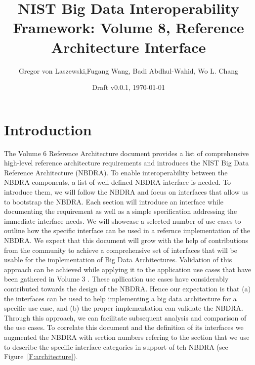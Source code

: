\documentclass[10pt]{article}
\title{NIST Big Data Interoperability Framework: Volume 8, Reference Architecture Interface}
\author{Gregor von Laszewski,Fugang Wang, Badi Abdhul-Wahid, Wo L. Chang}
\date{Draft v0.0.1, \today}
\begin{document}



\flushbottom %




%


\newpage

\linenumbers
\section{Introduction}

The Volume 6 Reference Architecture document provides a list of comprehensive high-level reference architecture requirements and introduces the NIST Big Data Reference Architecture (NBDRA).  To enable interoperability between the NBDRA components, a list of well-defined NBDRA interface is needed. To introduce them, we will follow the NBDRA and focus on interfaces that allow us to bootstrap the NBDRA. Each section will introduce an interface while documenting the requirement as well as a simple specification addressing the immediate interface needs. We will showcase a selected number of use cases to outline how the specific interface can be used in a refernce implementation of the NBDRA. We expect that this document will grow with the help of contributions from the community to achieve a comprehensive set of interfaces that will be usable for the implementation of Big Data Architectures. Validation of this approach can be achieved while applying it to the application use cases that have been gathered in Volume 3 \cite{}. These apllication use cases have considerably contributed towards the design of the NBDRA. Hence our expectation is that (a) the interfaces can be used to help implementing a big data architecture for a specific use case, and (b) the proper implementation can validate the NBDRA. Through this approach, we can facilitate subsequent analysis and comparison of the use cases. To correlate this document and the definition of its interfaces we augmented the NBDRA with section numbers refering to the section that we use to describe the specific interface categories in support of teh NBDRA  (see Figure~\ref{F:architecture}). 
\end{document}
